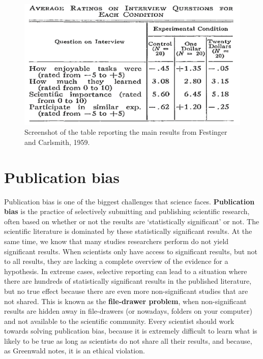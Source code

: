 \documentclass[
  oneside]{krantz}
\begin{document}
\begin{figure}

{\centering \includegraphics[width=1\linewidth]{images/festinger_carlsmith} 

}

\caption{Screenshot of the table reporting the main results from Festinger and Carlsmith, 1959.}\label{fig:festinger}
\end{figure}

\hypertarget{publication-bias}{%
\section{Publication bias}\label{publication-bias}}

Publication bias is one of the biggest challenges that science faces. \textbf{Publication bias} is the practice of selectively submitting and publishing scientific research, often based on whether or not the results are `statistically significant' or not. The scientific literature is dominated by these statistically significant results. At the same time, we know that many studies researchers perform do not yield significant results. When scientists only have access to significant results, but not to all results, they are lacking a complete overview of the evidence for a hypothesis. In extreme cases, selective reporting can lead to a situation where there are hundreds of statistically significant results in the published literature, but no true effect because there are even more non-significant studies that are not shared. This is known as the \textbf{file-drawer problem}, when non-significant results are hidden away in file-drawers (or nowadays, folders on your computer) and not available to the scientific community. Every scientist should work towards solving publication bias, because it is extremely difficult to learn what is likely to be true as long as scientists do not share all their results, and because, as Greenwald \citeyearpar{greenwald_consequences_1975} notes, it is an ethical violation.
\end{document}
